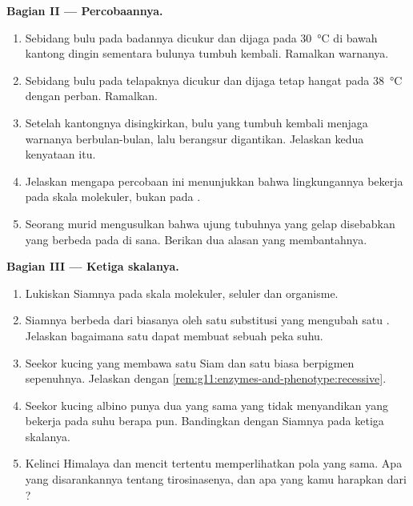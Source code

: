 \begin{problem}
\medskip
\noindent\textbf{Bagian II --- Percobaannya.}
\begin{enumerate}[resume]
  \item Sebidang bulu pada badannya dicukur dan dijaga pada
        \qty{30}{\celsius} di bawah kantong dingin sementara bulunya
        tumbuh kembali. Ramalkan warnanya.
  \item Sebidang bulu pada telapaknya dicukur dan dijaga tetap hangat
        pada \qty{38}{\celsius} dengan perban. Ramalkan.
  \item Setelah kantongnya disingkirkan, bulu yang tumbuh kembali
        menjaga warnanya berbulan-bulan, lalu berangsur digantikan.
        Jelaskan kedua kenyataan itu.
  \item Jelaskan mengapa percobaan ini menunjukkan bahwa lingkungannya
        bekerja pada skala molekuler, bukan pada .
  \item Seorang murid mengusulkan bahwa ujung tubuhnya yang gelap
        disebabkan  yang berbeda pada  di sana. Berikan dua
        alasan yang membantahnya.
\end{enumerate}

\medskip
\noindent\textbf{Bagian III --- Ketiga skalanya.}
\begin{enumerate}[resume]
  \item Lukiskan  Siamnya pada skala molekuler, seluler dan
        organisme.
  \item {} Siamnya berbeda dari  biasanya oleh satu substitusi
        yang mengubah satu . Jelaskan bagaimana satu  dapat membuat sebuah  peka suhu.
  \item Seekor kucing yang membawa satu  Siam dan satu  biasa
        berpigmen sepenuhnya. Jelaskan dengan
        \cref{rem:g11:enzymes-and-phenotype:recessive}.
  \item Seekor kucing albino punya dua   yang sama yang tidak
        menyandikan  yang bekerja pada suhu berapa pun.
        Bandingkan  dengan  Siamnya pada ketiga skalanya.
  \item Kelinci Himalaya dan mencit tertentu memperlihatkan pola yang
        sama. Apa yang disarankannya tentang  tirosinasenya, dan apa
        yang kamu harapkan dari ?
\end{enumerate}


\end{problem}
